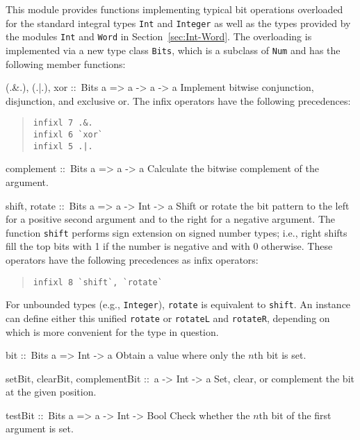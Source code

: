 \documentclass[a4paper,twoside]{article}
\makeatletter
\newcommand{\code}[1]{\texttt{#1}}      %
\newenvironment{codedesc}{%
  \list{}{\labelwidth\z@
    \let\makelabel\codedesclabel}
  }{%
  \endlist
  }
\newcommand*{\codedesclabel}[1]{%
  \hspace{-\leftmargin}
  \parbox[b]{\labelwidth}{\makebox[0pt][l]{\code{#1}}\\}\hfil\relax
  }
\makeatother
\begin{document}
This module provides functions implementing typical bit operations overloaded
for the standard integral types \code{Int} and \code{Integer} as well as the
types provided by the modules \code{Int} and \code{Word} in
Section~\ref{sec:Int-Word}.  The overloading is implemented via a new type
class \code{Bits}, which is a subclass of \code{Num} and has the following
member functions:
%
\begin{codedesc}
\item[(.\&.), (.|.), xor ::\ Bits a => a -> a -> a]  Implement bitwise
  conjunction, disjunction, and exclusive or.  The infix operators have the
  following precedences:
  \begin{quote}
\begin{verbatim}
infixl 7 .&.
infixl 6 `xor`
infixl 5 .|.
\end{verbatim}
  \end{quote}
  
\item[complement ::\ Bits a => a -> a] Calculate the bitwise complement of the
  argument.
  
\item[shift, rotate ::\ Bits a => a -> Int -> a] Shift or rotate the bit
  pattern to the left for a positive second argument and to the right for a
  negative argument.  The function \code{shift} performs sign extension on
  signed number types; i.e., right shifts fill the top bits with 1 if the
  number is negative and with 0 otherwise.  These operators have the following
  precedences as infix operators:
  \begin{quote}
\begin{verbatim}
infixl 8 `shift`, `rotate`
\end{verbatim}
  \end{quote}
  For unbounded types (e.g., \code{Integer}), \code{rotate} is equivalent to
  \code{shift}.  An instance can define either this unified \code{rotate} or
  \code{rotateL} and \code{rotateR}, depending on which is more convenient for
  the type in question.

\item[bit ::\ Bits a => Int -> a] Obtain a value where only the $n$th bit
  is set.
  
\item[setBit, clearBit, complementBit ::\ a -> Int -> a] Set, clear, or
  complement the bit at the given position.
  
\item[testBit ::\ Bits a => a -> Int -> Bool] Check whether the $n$th bit of
  the first argument is set.


\end{codedesc}
\end{document}
